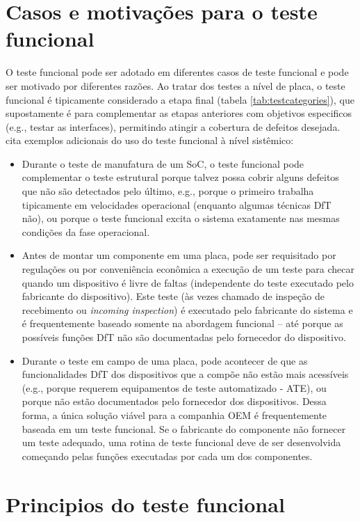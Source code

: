 	\section{Casos e motivações para o teste funcional}
		O teste funcional pode ser adotado em diferentes casos de teste funcional e pode ser motivado por diferentes razões. Ao tratar dos testes a nível de placa, o teste funcional é tipicamente considerado a etapa final (tabela \ref{tab:testcategories}), que supostamente é para complementar as etapas anteriores com objetivos especificos (e.g., testar as interfaces), permitindo atingir a cobertura de defeitos desejada. \citet{jutman2014high} cita exemplos adicionais do uso do teste funcional à nível sistêmico:
		\begin{itemize}
			\item Durante o teste de manufatura de um SoC, o teste funcional pode complementar o teste estrutural porque talvez possa cobrir alguns defeitos que não são detectados pelo último, e.g., porque o primeiro trabalha tipicamente em velocidades operacional (enquanto algumas técnicas DfT não), ou porque o teste funcional excita o sistema exatamente nas mesmas condições da fase operacional.
			\item Antes de montar um componente em uma placa, pode ser requisitado por regulações ou por conveniência econômica a execução de um teste para checar quando um dispositivo é livre de faltas (independente do teste executado pelo fabricante do dispositivo). Este teste (às vezes chamado de inspeção de recebimento ou \textit{incoming inspection}) é executado pelo fabricante do sistema e é frequentemente baseado somente na abordagem funcional -- até porque as possíveis funções DfT não são documentadas pelo fornecedor do dispositivo.
			\item Durante o teste em campo de uma placa, pode acontecer de que as funcionalidades DfT dos dispositivos que a compõe não estão mais acessíveis (e.g., porque requerem equipamentos de teste automatizado - ATE), ou porque não estão documentados pelo fornecedor dos dispositivos. Dessa forma, a única solução viável para a companhia OEM é frequentemente baseada em um teste funcional. Se o fabricante do componente não fornecer um teste adequado, uma rotina de teste funcional deve de ser desenvolvida começando pelas funções executadas por cada um dos componentes.
		\end{itemize}
	
	\section{Principios do teste funcional}
	
